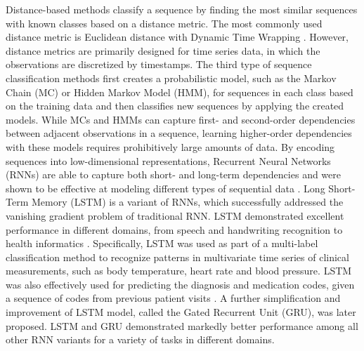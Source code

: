 \documentclass{amia_summit_2018}
\begin{document}
Distance-based methods classify a sequence by finding the most similar sequences with known classes based on a distance metric. The most commonly used distance metric is Euclidean distance with Dynamic Time Wrapping \cite{keogh2000scaling}. However, distance metrics are primarily designed for time series data, in which the observations are discretized by timestamps. The third type of sequence classification methods first creates a probabilistic model, such as the Markov Chain (MC) or Hidden Markov Model \cite{rabiner1989tutorial} (HMM), for sequences in each class based on the training data and then classifies new sequences by applying the created models. While MCs and HMMs can capture first- and second-order dependencies between adjacent observations in a sequence, learning higher-order dependencies with these models requires prohibitively large amounts of data. By encoding sequences into low-dimensional representations, Recurrent Neural Networks (RNNs) are able to capture both short- and long-term dependencies and were shown to be effective at modeling different types of sequential data \cite{lipton2015critical}. Long Short-Term Memory (LSTM) \cite{hochreiter1997long} is a variant of RNNs, which successfully addressed the vanishing gradient problem \cite{bengio1993problem} of traditional RNN. LSTM demonstrated excellent performance in different domains, from speech \cite{graves2013speech} and handwriting recognition\cite{nion2013handwritten} to health informatics \cite{lipton2015learning, choi2016doctor}. Specifically, LSTM was used as part of a multi-label classification method to recognize patterns in multivariate time series of clinical measurements, such as body temperature, heart rate and blood pressure\cite{lipton2015learning}. LSTM was also effectively used for predicting the diagnosis and medication codes, given a sequence of codes from previous patient visits \cite{choi2016doctor}. A further simplification and improvement of LSTM model, called the Gated Recurrent
Unit (GRU)\cite{chung2014empirical}, was later proposed. LSTM and GRU demonstrated markedly better performance among all other RNN variants for a variety of tasks in different domains.
  
\end{document}

